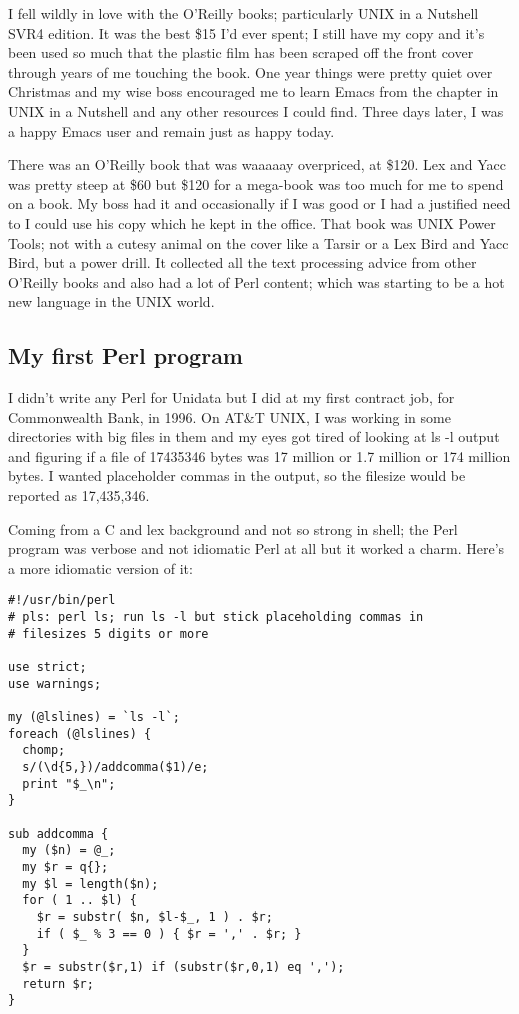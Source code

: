 \documentclass{article}
\begin{document}
I fell wildly in love with the O'Reilly books; particularly UNIX in a
Nutshell SVR4 edition. It was the best \$15 I'd ever spent; I still
have my copy and it's been used so much that the plastic film has been
scraped off the front cover through years of me touching the
book. One year things were pretty quiet over Christmas and my wise
boss encouraged me to learn Emacs from the chapter in UNIX in a
Nutshell and any other resources I could find. Three days later, I was
a happy Emacs user and remain just as happy today.

There was an O'Reilly book that was waaaaay overpriced, at \$120. Lex
and Yacc was pretty steep at \$60 but \$120 for a mega-book was too
much for me to spend on a book. My boss had it and occasionally if I
was good or I had a justified need to I could use his copy which he
kept in the office. That book was UNIX Power Tools; not with a
cutesy animal on the cover like a Tarsir or a Lex Bird and Yacc Bird,
but a power drill. It collected all the text processing advice from
other O'Reilly books and also had a lot of Perl content; which was
starting to be a hot new language in the UNIX world.

\subsection{My first Perl program}

I didn't write any Perl for Unidata but I did at my
first contract job, for Commonwealth Bank, in 1996. On AT\&T UNIX, I
was working in some directories with big files in them and my eyes got
tired of looking at ls -l output and figuring if a file of 17435346
bytes was 17 million or 1.7 million or 174 million bytes. I wanted
placeholder commas in the output, so the filesize would be reported
as 17,435,346.

Coming from a C and lex background and not so strong in shell; the
Perl program was verbose and not idiomatic Perl at all but it worked a
charm. Here's a more idiomatic version of it:

\begin{verbatim}
#!/usr/bin/perl
# pls: perl ls; run ls -l but stick placeholding commas in
# filesizes 5 digits or more

use strict;
use warnings;

my (@lslines) = `ls -l`;
foreach (@lslines) {
  chomp;
  s/(\d{5,})/addcomma($1)/e;
  print "$_\n";
}

sub addcomma {
  my ($n) = @_;
  my $r = q{};
  my $l = length($n);
  for ( 1 .. $l) {
    $r = substr( $n, $l-$_, 1 ) . $r;
    if ( $_ % 3 == 0 ) { $r = ',' . $r; }
  }
  $r = substr($r,1) if (substr($r,0,1) eq ',');
  return $r;
}
\end{verbatim}
\end{document}
